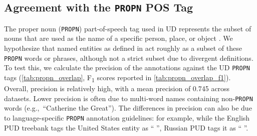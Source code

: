 \subsection{Agreement with the \texttt{PROPN} POS Tag}
\label{ssection:propn}
The proper noun (\texttt{PROPN}) part-of-speech tag used in UD represents the subset of nouns that are used as the name of a specific person, place, or object \cite{nivre-etal-2020-universal}.
We hypothesize that named entities as defined in \shortname{} act roughly as a subset of these \texttt{PROPN} words or phrases, although not a strict subset due to divergent definitions.
To test this, we calculate the precision of the \shortname{} annotations against the UD \texttt{PROPN} tags (\autoref{tab:propn_overlap}, F\textsubscript{1} scores reported in \autoref{tab:propn_overlap_f1}).
Overall, precision is relatively high, with a mean precision of 0.745 across datasets.
Lower precision is often due to multi-word names containing non-\texttt{PROPN} words (e.g.,~``Catherine the Great'').
The differences in precision can also be due to language-specific \texttt{PROPN} annotation guidelines: for example, while the English PUD treebank tags the United States entity as `` '', Russian PUD tags it as {\selectfont `` ''}.
